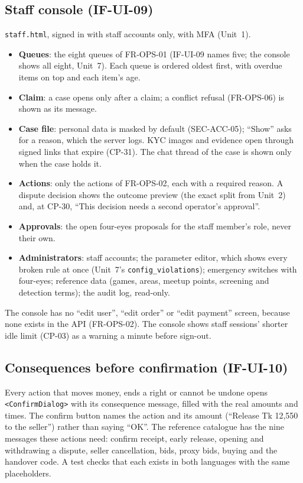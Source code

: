 \documentclass[11pt,a4paper]{article}
\begin{document}
\subsection{Staff console (IF-UI-09)}
\label{sec:console}
\texttt{staff.html}, signed in with staff accounts only, with MFA (Unit~1).
\begin{itemize}[nosep]
  \item \textbf{Queues}: the eight queues of FR-OPS-01 (IF-UI-09 names five; the console shows all eight, Unit~7). Each queue is ordered oldest first, with overdue items on top and each item's age.
  \item \textbf{Claim}: a case opens only after a claim; a conflict refusal (FR-OPS-06) is shown as its message.
  \item \textbf{Case file}: personal data is masked by default (SEC-ACC-05); ``Show'' asks for a reason, which the server logs. KYC images and evidence open through signed links that expire (CP-31). The chat thread of the case is shown only when the case holds it.
  \item \textbf{Actions}: only the actions of FR-OPS-02, each with a required reason. A dispute decision shows the outcome preview (the exact split from Unit~2) and, at CP-30, ``This decision needs a second operator's approval''.
  \item \textbf{Approvals}: the open four-eyes proposals for the staff member's role, never their own.
  \item \textbf{Administrators}: staff accounts; the parameter editor, which shows every broken rule at once (Unit~7's \texttt{config\_violations}); emergency switches with four-eyes; reference data (games, areas, meetup points, screening and detection terms); the audit log, read-only.
\end{itemize}
The console has no ``edit user'', ``edit order'' or ``edit payment'' screen, because none exists in the API (FR-OPS-02). The console shows staff sessions' shorter idle limit (CP-03) as a warning a minute before sign-out.

\subsection{Consequences before confirmation (IF-UI-10)}
Every action that moves money, ends a right or cannot be undone opens \texttt{<ConfirmDialog>} with its consequence message, filled with the real amounts and times. The confirm button names the action and its amount (``Release Tk 12,550 to the seller'') rather than saying ``OK''. The reference catalogue has the nine messages these actions need: confirm receipt, early release, opening and withdrawing a dispute, seller cancellation, bids, proxy bids, buying and the handover code. A test checks that each exists in both languages with the same placeholders.
\end{document}
